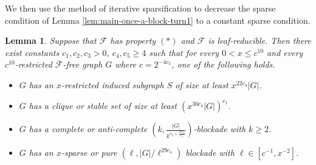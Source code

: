 \documentclass[a4paper,11pt]{article}
\newtheorem{lemma}[theorem]{Lemma}
\begin{document}
    We then use the method of iterative sparsification to decrease the sparse condition of Lemma \ref{lem:main-once-a-block-turn1} to a constant sparse condition.
   
    \begin{lemma}\label{lem:main-iterative-sparsification-turn1}
        Suppose that $\mathcal{F}$ has property $(*)$ and $\mathcal{F}$ is leaf-reducible. Then 
        there exist constants $c_1,c_2,c_3>0$, $c_4,c_5\ge 4$ such that for every $0<x\leq c^{10}$ and every $c^{10}$-restricted $\overline{\mathcal{F}}$-free graph $G$ where $c=2^{-4c_5}$, one of the following holds.
        \begin{itemize}
            \item[$(1)$] $G$ has an $x$-restricted induced subgraph $S$ of size at least $x^{22c_4}|G|$.
            
            \item[$(2)$] $G$ has a clique or stable set of size at least $(x^{30c_4}|G|)^{c_1}$.
            
            \item[$(3)$] $G$ has a complete or anti-complete $(k,\frac{|G|}{k^{c_2+\frac{27c_4}{c_3}}})$-blockade with $k\geq 2$.
            
            \item[$(4)$] $G$ has an $x$-sparse or pure $(\ell,|G|/\ell^{29c_4})$ blockade with $\ell\in[c^{-1}, x^{-2}]$.  
            
        \end{itemize}
    \end{lemma}
    
\end{document}
